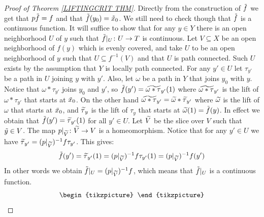 \documentclass[11pt, letterpaper, oneside]{report}
\theoremstyle{pplain}
\theoremstyle{ddefinition}
\theoremstyle{nnn}
\theoremstyle{eexercise}
\newcommand{\ntilde}{\skew{3}\tilde}
\newcommand{\nwidetilde}{\skew{4}\widetilde}
\begin{document}
\begin{proof}[Proof of Theorem \ref{LIFTINGCRIT THM}]
Directly from the construction of $\ntilde{f}$ we get that $p\ntilde{f} = f$ and that $\ntilde{f}(y_{0}) = \ntilde{x}_{0}$. 
We still need to check though that $\ntilde{f}$ is a continuous function. It will suffice to show that for any 
$y\in Y$ there is an open neighborhood $U$ of $y$ such that $\ntilde{f}|_{U}\colon U\to T$ is continuous. 
Let $V\subseteq X$ be an open neighborhood of $f(y)$ which is evenly covered, and take $U$ to be an open 
neighborhood of $y$ such that  $U\subseteq f^{-1}(V)$ and that $U$ is path connected. Such $U$ exists 
by the assumption that $Y$ is locally path connected. For any $y'\in U$ let $\tau_{y'}$ be a path in $U$ 
joining $y$ with $y'$. Also, let $\omega$ be a path in $Y$ that joins $y_{0}$ with $y$. Notice that 
$\omega\ast\tau_{y'}$ joins $y_{0}$ and $y'$, so $\ntilde{f}(y') = \nwidetilde{\omega\ast \tau}_{y'}(1)$
where $\nwidetilde{\omega\ast \tau}_{y'}$ is the lift of $\omega\ast\tau_{y'}$ that starts at $\ntilde{x}_{0}$. 
On the other hand $\nwidetilde{\omega\ast \tau}_{y'} = \nwidetilde{\omega}\ast \nwidetilde{\tau}_{y'}$
where $\nwidetilde{\omega}$ is the lift of $\omega$ that starts at $\ntilde{x}_{0}$, and 
$\nwidetilde{\tau}_{y}$ is the lift of $\tau_{y}$ that starts at $\nwidetilde{\omega}(1) = \ntilde{f}(y)$. 
In effect we obtain that $\ntilde{f}(y') = \nwidetilde{\tau}_{y'}(1)$ for all $y'\in U$. Let $\nwidetilde{V}$
be the slice over $V$ such that $\ntilde{y}\in V$. The map $p|_{\nwidetilde{V}}\colon \nwidetilde{V} \to V$
is a homeomorphism. Notice that for any $y'\in U$ we have 
$\nwidetilde{\tau}_{y'} = (p|_{\nwidetilde{V}})^{-1}f\tau_{y'}$. This gives:
$$\ntilde{f}(y') = \nwidetilde{\tau}_{y'}(1) =  (p|_{\nwidetilde{V}})^{-1}f\tau_{y'}(1) =  (p|_{\nwidetilde{V}})^{-1}f(y')$$
In other words we obtain $\ntilde{f}|_{U} = (p|_{\nwidetilde{V}})^{-1}f$, which means that   
$\ntilde{f}|_{U}$ is a continuous function.  
\begin{equation*}
\begin{tikzpicture}


\end{tikzpicture}
\end{equation*}
\end{proof}
\end{document}
